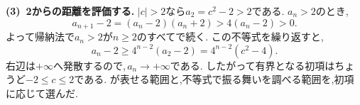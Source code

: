 \begin{enumerate}[label=\textbf{問\arabic*.},leftmargin=3.8em,format=\bookitemlink{practice-special}{solution}{problem}]
                \smallskip
                \textbf{(3)~2からの距離を評価する.}
                $\displaystyle |c|>2$なら$\displaystyle a_2=c^2-2>2$である.
                $\displaystyle a_n>2$のとき,
                \[
                  a_{n+1}-2=(a_n-2)(a_n+2)>4(a_n-2)>0.
                \]
                よって帰納法で$\displaystyle a_n>2$が$\displaystyle n\ge2$のすべてで続く.
                この不等式を繰り返すと,
                \[
                  a_n-2\ge4^{n-2}(a_2-2)
                         =4^{n-2}(c^2-4).
                \]
                右辺は$\displaystyle +\infty$へ発散するので,\,$\displaystyle a_n\to+\infty$である.
                したがって有界となる初項はちょうど$\displaystyle -2\le c\le2$である.
                が表せる範囲と,不等式で振る舞いを調べる範囲を,初項に応じて選んだ.
        \end{enumerate}
